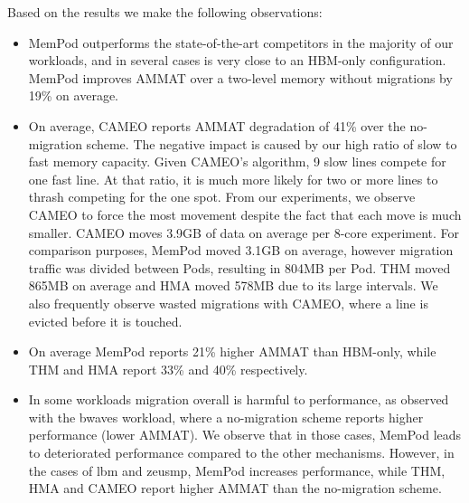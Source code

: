 Based on the results we make the following observations:
\begin{itemize}
\setlength\itemsep{0em}
	\item MemPod outperforms the state-of-the-art competitors in the majority of our workloads, and in several cases is very close to an HBM-only 
configuration. MemPod improves AMMAT over a two-level memory 
without migrations by 19\% on average.
	\item On average, CAMEO reports AMMAT degradation of 41\% over the no-migration scheme. The negative impact is caused by our high ratio of
slow to fast memory capacity.  Given CAMEO's algorithm, 9 slow lines
compete for one fast line.  At that ratio, it is much more likely for
two or more lines to thrash competing for the one spot.
From our experiments, we observe CAMEO to force the most movement despite the
fact that each move is much smaller.  CAMEO moves 3.9GB of data on average per 
8-core experiment. For comparison purposes, MemPod moved 3.1GB on average, however migration traffic was divided between Pods, resulting in 804MB per Pod. 
THM moved 865MB on average and HMA moved 578MB due to its large intervals. 
We also frequently observe wasted migrations with CAMEO, where a 
line is 
evicted before it is touched. 
	\item On average MemPod reports 21\% higher AMMAT than HBM-only, while THM and HMA report 33\% and 40\% respectively.
	
	\item In some workloads migration overall is harmful to performance, 
as observed with the bwaves workload, where a no-migration scheme reports 
higher performance (lower AMMAT). We observe that in those cases, MemPod leads to deteriorated performance compared to the other mechanisms. However, in the cases of lbm and zeusmp, 
MemPod increases performance, while THM, HMA and CAMEO report higher AMMAT than the no-migration scheme.


\end{itemize}
